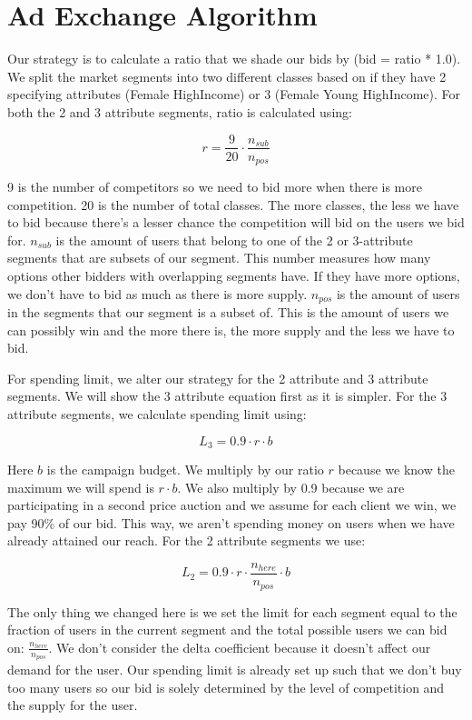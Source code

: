 \documentclass[12pt,letterpaper]{article}
\begin{document}
\section*{Ad Exchange Algorithm}
Our strategy is to calculate a ratio that we shade our bids by (bid = ratio * 1.0). 
We split the market segments into two different classes based on if they have
2 specifying attributes (Female HighIncome) or 3 (Female Young HighIncome).
For both the 2 and 3 attribute segments, ratio is calculated using:

$$r=\frac{9}{20}\cdot \frac{n_{sub}}{n_{pos}}$$

9 is the number of competitors so we need to bid more when there is more
competition. 20 is the number of total classes. The more classes, the less
we have to bid because there's a lesser chance the competition will bid 
on the users we bid for. $n_{sub}$ is the amount of users that belong to 
one of the 2 or 3-attribute segments that are subsets of our segment. This number
measures how many options other bidders with overlapping segments have. If
they have more options, we don't have to bid as much as there is more supply. 
$n_{pos}$ is the amount of users in the segments that our segment is a subset of. 
This is the amount of users we can possibly win and the more there is, the more
supply and the less we have to bid. 

For spending limit, we alter our strategy for the 2 attribute and 3 attribute 
segments. We will show the 3 attribute equation first as it is simpler.
For the 3 attribute segments, we calculate spending limit using:

$$L_3 = 0.9\cdot r\cdot b$$

Here $b$ is the campaign budget. We multiply by our ratio $r$ because we 
know the maximum we will spend is $r\cdot b$. We also multiply by 0.9 
because we are participating in a second price auction and we assume for each
client we win, we pay 90\% of our bid. This way, we aren't spending money on
users when we have already attained our reach. For the 2 attribute segments we use:

$$L_2 = 0.9\cdot r\cdot \frac{n_{here}}{n_{pos}}\cdot b$$

The only thing we changed here is we set the limit for each segment equal to
the fraction of users in the current segment and the total possible users
we can bid on: $\frac{n_{here}}{n_{pos}}$. We don't consider the delta coefficient because it doesn't affect our demand for the user.
Our spending limit is already set up such that we don't buy too many users so our bid is 
solely determined by the level of competition and the supply for the user. 
\end{document}
